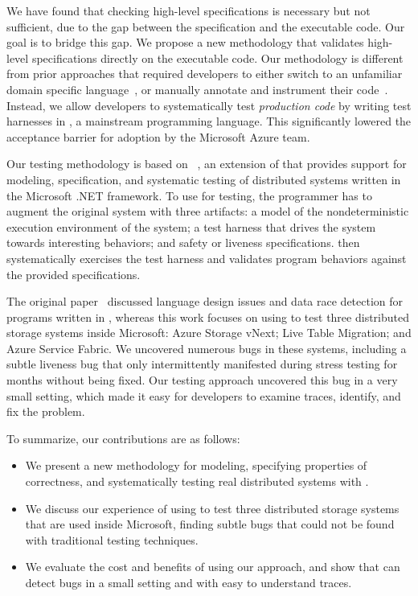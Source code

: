 We have found that checking high-level specifications is necessary but not sufficient, due to the gap between the specification and the executable code. Our goal is to bridge this gap. We propose a new methodology that validates high-level specifications directly on the executable code. Our methodology is different from prior approaches that required developers to either switch to an unfamiliar domain specific language~\cite{killian2007life, desai2015building}, or manually annotate and instrument their code~\cite{simsa2011dbug}. Instead, we allow developers to systematically test \emph{production code} by writing test harnesses in \csharp, a mainstream programming language. This significantly lowered the acceptance barrier for adoption by the Microsoft Azure team.

Our testing methodology is based on \psharp~\cite{deligiannis2015psharp}, an extension of \csharp that provides support for modeling, specification, and systematic testing of distributed systems written in the Microsoft .NET framework. To use \psharp for testing, the programmer has to augment the original system with three artifacts: a model of the nondeterministic execution environment of the system; a test harness that drives the system towards interesting behaviors; and safety or liveness specifications. \psharp then systematically exercises the test harness and validates program behaviors against the provided specifications.

The original \psharp paper~\cite{deligiannis2015psharp} discussed language design issues and data race detection for programs written in \psharp, whereas this work focuses on using \psharp to test three distributed storage systems inside Microsoft: Azure Storage vNext; Live Table Migration; and Azure Service Fabric. We uncovered numerous bugs in these systems, including a subtle liveness bug that only intermittently manifested during stress testing for months without being fixed. Our testing approach uncovered this bug in a very small setting, which made it easy for developers to examine traces, identify, and fix the problem.

To summarize, our contributions are as follows:
\begin{itemize}
\item We present a new methodology for modeling, specifying properties of correctness, and systematically testing real distributed systems with \psharp.
\item We discuss our experience of using \psharp to test three distributed storage systems that are used inside Microsoft, finding subtle bugs that could not be found with traditional testing techniques.
\item We evaluate the cost and benefits of using our approach, and show that \psharp can detect bugs in a small setting and with easy to understand traces.
\end{itemize}
